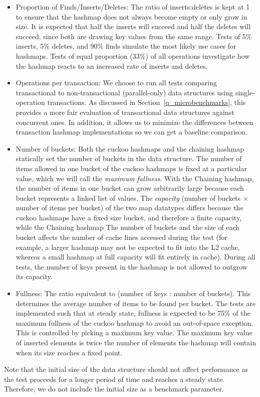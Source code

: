 \begin{itemize}
    \item Proportion of Finds/Inserts/Deletes: The ratio of inserts:deletes is kept at 1 to ensure that the hashmap does not always become empty or only grow in size. It is expected that half the inserts will succeed and half the deletes will succeed, since both are drawing key values from the same range. Tests of 5\% inserts, 5\% deletes, and 90\% finds simulate the most likely use cases for hashmaps\cite{hm1}. Tests of equal proportion (33\%) of all operations investigate how the hashmap reacts to an increased rate of inserts and deletes.
    \item Operations per transaction: We choose to run all tests comparing transactional to non-transactional (parallel-only) data structures using single-operation transactions. As discussed in Section~\ref{q_microbenchmarks}, this provides a more fair evaluation of transactional data structures against concurrent ones. In addition, it allows us to minimize the differences between transaction hashmap implementations so we can get a baseline comparison.
    \item Number of buckets: Both the cuckoo hashmaps and the chaining hashmap statically set the number of buckets in the data structure. The number of items allowed in one bucket of the cuckoo hashmaps is fixed at a particular value, which we will call the \emph{maximum fullness}. 
        With the Chaining hashmap, the number of items in one bucket can grow arbitrarily large because each bucket represents a linked list of values.
        The \emph{capacity} (number of buckets $\times$ number of items per bucket) of the two map datatypes differs because the cuckoo hashmaps have a fixed size bucket, and therefore a finite capacity, while the Chaining hashmap 
        The number of buckets and the size of each bucket affects the number of cache lines accessed during the test (for example, a larger hashmap may not be expected to fit into the L2 cache, whereas a small hashmap at full capacity will fit entirely in cache). During all tests, the number of keys present in the hashmap is not allowed to outgrow its capacity.
    \item Fullness: The ratio equivalent to (number of keys : number of buckets). This determines the average number of items to be found per bucket. The tests are implemented such that at steady state, fullness is expected to be 75\% of the maximum fullness of the cuckoo hashmap to avoid an out-of-space exception. This is controlled by picking a maximum key value. The maximum key value of inserted elements is twice the number of elements the hashmap will contain when its size reaches a fixed point.
\end{itemize}
Note that the initial size of the data structure should not affect performance as the test proceeds for a longer period of time and reaches a steady state. Therefore, we do not include the initial size as a benchmark parameter.

